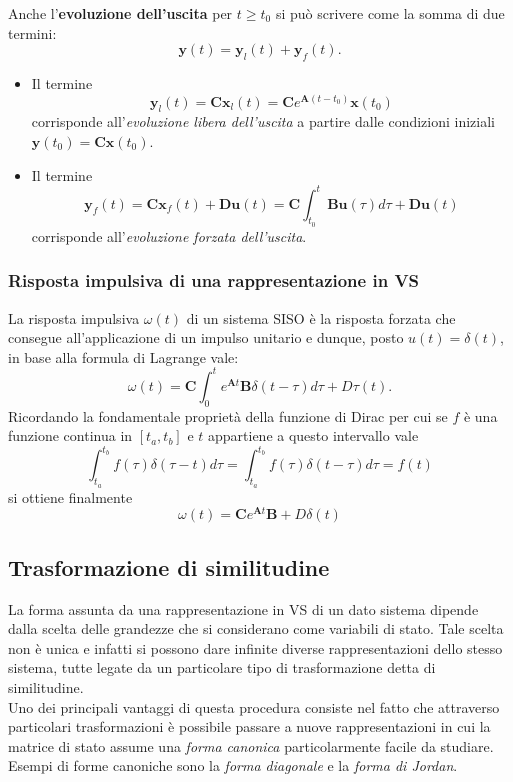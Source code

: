 \documentclass[a4paper]{article}
\renewcommand{\vec}{\bm}
\theoremstyle{definition}
\begin{document}
			Anche l'\textbf{evoluzione dell'uscita} per $ t\geq t_0 $ si può scrivere come la somma di due termini:
			\[
				\vec{y}(t) = \vec{y}_l(t) + \vec{y}_f(t).
			\]
			\begin{itemize}
				\item Il termine
				\[
					\vec{y}_l(t) = \vec{C}\vec{x}_l(t) = \vec{C}e^{\vec{A}(t-t_0)}\vec{x}(t_0)
				\]
				corrisponde all'\textit{evoluzione libera dell'uscita} a partire dalle condizioni iniziali $ \vec{y}(t_0) = \vec{C}\vec{x}(t_0) $.
				\item Il termine
				\[
					\vec{y}_f(t) = \vec{C}\vec{x}_f(t) + \vec{D}\vec{u}(t) = 
					\vec{C}\int_{t_0}^{t} \vec{B}\vec{u}(\tau)d\tau + \vec{D}\vec{u}(t)
				\]
				corrisponde all'\textit{evoluzione forzata dell'uscita}.
			\end{itemize}
		
		\subsubsection{Risposta impulsiva di una rappresentazione in VS}
			La risposta impulsiva $ \omega(t) $ di un sistema SISO è la risposta forzata che consegue all’applicazione di un impulso unitario e dunque, posto $ u(t) = \delta(t) $, in base alla formula di Lagrange vale:
			\[
				\omega(t) = \vec{C}\int_{0}^{t} e^{\vec{A}t}\vec{B}\delta(t - \tau)d\tau + D\tau (t).
			\]
			Ricordando la fondamentale proprietà della funzione di Dirac per cui se $ f $ è una funzione continua in $ \left[ t_a,t_b \right] $ e $ t $ appartiene a questo intervallo vale
			\[
				\int_{t_a}^{t_b} f(\tau)\delta(\tau - t) d\tau =
				\int_{t_a}^{t_b} f(\tau)\delta(t - \tau) d\tau = f(t)
			\]
			si ottiene finalmente
			\[
				\omega(t) = \vec{C}e^{\vec{A}t}\vec{B} + D\delta(t)
			\]
			
		\subsection{Trasformazione di similitudine}
			La forma assunta da una rappresentazione in VS di un dato sistema dipende dalla
			scelta delle grandezze che si considerano come variabili di stato. Tale scelta non è
			unica e infatti si possono dare infinite diverse rappresentazioni dello stesso sistema,
			tutte legate da un particolare tipo di trasformazione detta di similitudine.\\
			Uno dei principali vantaggi di questa procedura consiste nel fatto che attraverso
			particolari trasformazioni è possibile passare a nuove rappresentazioni in cui la matrice di stato assume una \textit{forma canonica} particolarmente facile da studiare.\\
			Esempi di forme canoniche sono la \textit{forma diagonale} e la \textit{forma di Jordan}.
			
\end{document}
